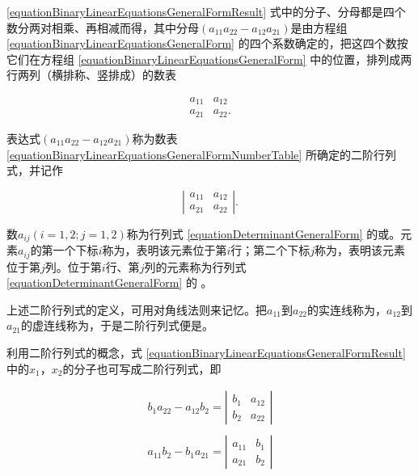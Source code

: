 \ref{equationBinaryLinearEquationsGeneralFormResult} 式中的分子、分母都是四个数分两对相乘、再相减而得，其中分母$ (a_{11}a_{22}-a_{12}a_{21}) $是由方程组 \ref{equationBinaryLinearEquationsGeneralForm} 的四个系数确定的，把这四个数按它们在方程组 \ref{equationBinaryLinearEquationsGeneralForm} 中的位置，排列成两行两列（横排称、竖排成）的数表

\begin{equation} \label{equationBinaryLinearEquationsGeneralFormNumberTable}
\begin{array}{cc}
a_{11} & a_{12}\\
a_{21} & a_{22}.
\end{array}
\end{equation}

表达式$ (a_{11}a_{22}-a_{12}a_{21}) $称为数表 \ref{equationBinaryLinearEquationsGeneralFormNumberTable} 所确定的二阶行列式，并记作

\begin{equation} \label{equationDeterminantGeneralForm}
\left | \begin{array}{cc}
a_{11} & a_{12}\\
a_{21} & a_{22}
\end{array} \right |.
\end{equation}

数$ a_{ij} (i=1,2;j=1,2) $称为行列式 \ref{equationDeterminantGeneralForm} 的或。元素$ a_{ij} $的第一个下标$ i $称为，表明该元素位于第$ i $行；第二个下标$ j $称为，表明该元素位于第$ j $列。位于第$ i $行、第$ j $列的元素称为行列式 \ref{equationDeterminantGeneralForm} 的 。

上述二阶行列式的定义，可用对角线法则来记忆。把$ a_{11} $到$ a_{22} $的实连线称为，$ a_{12} $到$ a_{21} $的虚连线称为，于是二阶行列式便是。

利用二阶行列式的概念，式 \ref{equationBinaryLinearEquationsGeneralFormResult} 中的$ x_{1} $，$ x_{2} $的分子也可写成二阶行列式，即

\begin{equation} \label{equationDeterminantGeneralFormResult}
	\begin{array}{r}
	b_{1}a_{22}-a_{12}b_{2} = \left | \begin{array}{cc}
	b_{1} & a_{12}\\
	b_{2} & a_{22}
	\end{array} \right | \\
	\\
	a_{11}b_{2}-b_{1}a_{21} = \left | \begin{array}{cc}
		a_{11} & b_{1}\\
		a_{21} & b_{2}
		\end{array} \right |
	\end{array}
\end{equation}

